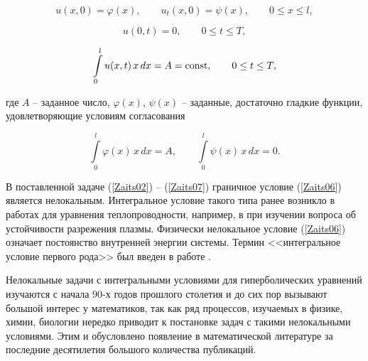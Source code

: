 \begin{equation}

\label{Zaits04}

u(x,0)=\varphi(x),\qquad u_t(x,0)=\psi(x),\qquad 0\leq x\leq l,

\end{equation}

\begin{equation}

\label{Zaits05}

u(0,t)=0,\qquad 0\leq t\leq T,

\end{equation}

\begin{equation}

\label{Zaits06}

\int\limits_0^l{u(x,t)\,x\,dx}=A={\rm const},\qquad 0\leq t\leq T,

\end{equation}

где $A$ -- заданное число, $\varphi(x)$, $\psi(x)$ -- заданные, достаточно гладкие функции, удовлетворяющие условиям согласования

\begin{equation}

\label{Zaits07}

\int\limits_0^l{\varphi(x)\,x\,dx}=A,\qquad \int\limits_0^l{\psi(x)\,x\,dx}=0.

\end{equation}



В поставленной задаче (\ref{Zaits02}) -- (\ref{Zaits07}) граничное условие (\ref{Zaits06}) является нелокальным. Интегральное условие такого типа ранее возникло в работах \cite{Zaitseva:Cann,Zaitseva:Kam,Zaitseva:Ionk} для уравнения теплопроводности, например, в \cite{Zaitseva:Ionk} при изучении вопроса об устойчивости разрежения плазмы. Физически нелокальное условие (\ref{Zaits06}) означает постоянство внутренней энергии системы. Термин <<интегральное условие первого рода>> был введен в работе \cite{Zaitseva:PulkLS1}.



Нелокальные задачи с интегральными условиями для гиперболических уравнений изучаются с начала 90-х годов прошлого столетия и до сих пор вызывают большой интерес у математиков, так как ряд процессов, изучаемых в физике, химии, биологии нередко приводит к постановке задач с такими нелокальными условиями. Этим и обусловлено появление в математической литературе за последние десятилетия большого количества публикаций.



